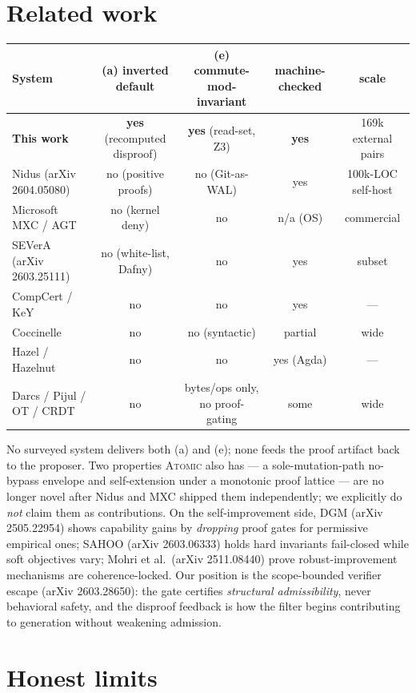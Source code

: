 \section{Related work}\label{sec:related}

\begin{center}
\small
\begin{tabular}{lcccc}
\toprule
System & (a) inverted default & (e) commute-mod-invariant & machine-checked & scale\\
\midrule
\textbf{This work} & \textbf{yes} (recomputed disproof) & \textbf{yes} (read-set, Z3) & \textbf{yes} & 169k external pairs\\
Nidus (arXiv 2604.05080) & no (positive proofs) & no (Git-as-WAL) & yes & 100k-LOC self-host\\
Microsoft MXC / AGT & no (kernel deny) & no & n/a (OS) & commercial\\
SEVerA (arXiv 2603.25111) & no (white-list, Dafny) & no & yes & subset\\
CompCert / KeY & no & no & yes & ---\\
Coccinelle & no & no (syntactic) & partial & wide\\
Hazel / Hazelnut & no & no & yes (Agda) & ---\\
Darcs / Pijul / OT / CRDT & no & bytes/ops only, no proof-gating & some & wide\\
\bottomrule
\end{tabular}
\end{center}

No surveyed system delivers both (a) and (e); none feeds the proof artifact back
to the proposer. Two properties \textsc{Atomic} also has --- a sole-mutation-path
no-bypass envelope and self-extension under a monotonic proof lattice --- are no
longer novel after Nidus and MXC shipped them independently; we explicitly do
\emph{not} claim them as contributions. On the self-improvement side, DGM
(arXiv 2505.22954) shows capability gains by \emph{dropping} proof gates for
permissive empirical ones; SAHOO (arXiv 2603.06333) holds hard invariants
fail-closed while soft objectives vary; Mohri et al.\ (arXiv 2511.08440) prove
robust-improvement mechanisms are coherence-locked. Our position is the
scope-bounded verifier escape (arXiv 2603.28650): the gate certifies
\emph{structural admissibility}, never behavioral safety, and the disproof
feedback is how the filter begins contributing to generation without weakening
admission.

\section{Honest limits}\label{sec:limits}

